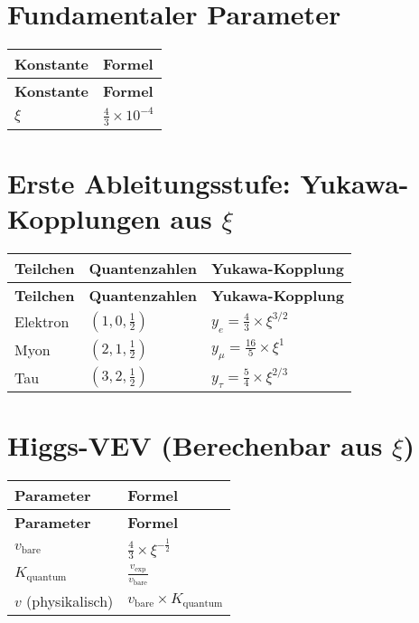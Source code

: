\documentclass[12pt,a4paper]{article}
\begin{document}
	\section{Fundamentaler Parameter}
	\begin{longtable}{|p{5cm}|p{6cm}|}
		\hline
		\textbf{Konstante} & \textbf{Formel} \\
		\hline
		\endfirsthead
		\hline
		\textbf{Konstante} & \textbf{Formel} \\
		\hline
		\endhead
		$\xi$ & $\frac{4}{3} \times 10^{-4}$ \\
		\hline
	\end{longtable}
	
	\section{Erste Ableitungsstufe: Yukawa-Kopplungen aus $\xi$}
	\begin{longtable}{|p{3cm}|p{3cm}|p{5cm}|}
		\hline
		\textbf{Teilchen} & \textbf{Quantenzahlen} & \textbf{Yukawa-Kopplung} \\
		\hline
		\endfirsthead
		\hline
		\textbf{Teilchen} & \textbf{Quantenzahlen} & \textbf{Yukawa-Kopplung} \\
		\hline
		\endhead
		Elektron & $(1,0,\frac{1}{2})$ & $y_e = \frac{4}{3} \times \xi^{3/2}$ \\
		\hline
		Myon & $(2,1,\frac{1}{2})$ & $y_{\mu} = \frac{16}{5} \times \xi^{1}$ \\
		\hline
		Tau & $(3,2,\frac{1}{2})$ & $y_{\tau} = \frac{5}{4} \times \xi^{2/3}$ \\
		\hline
	\end{longtable}
	
	\section{Higgs-VEV (Berechenbar aus $\xi$)}
	\begin{longtable}{|p{5cm}|p{6cm}|}
		\hline
		\textbf{Parameter} & \textbf{Formel} \\
		\hline
		\endfirsthead
		\hline
		\textbf{Parameter} & \textbf{Formel} \\
		\hline
		\endhead
		$v_{\text{bare}}$ & $\frac{4}{3} \times \xi^{-\frac{1}{2}}$ \\
		\hline
		$K_{\text{quantum}}$ & $\frac{v_{\text{exp}}}{v_{\text{bare}}}$ \\
		\hline
		$v$ (physikalisch) & $v_{\text{bare}} \times K_{\text{quantum}}$ \\
		\hline
	\end{longtable}
	
\end{document}
